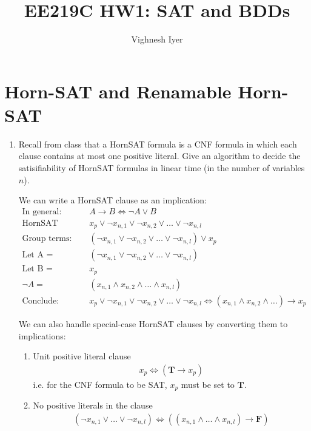 

\title{EE219C HW1: SAT and BDDs}
\author{Vighnesh Iyer}
\date{}
\maketitle

\section{Horn-SAT and Renamable Horn-SAT}
\begin{enumerate}[label=(\alph*)]
    \item {\color{blue}Recall from class that a HornSAT formula is a CNF formula in which each clause contains at most one positive literal. Give an algorithm to decide the satisifiability of HornSAT formulas in linear time (in the number of variables $n$).}

    We can write a HornSAT clause as an implication:
    \begin{align*}
        \text{In general: } &A \rightarrow B \iff \neg A \lor B \\
        \text{HornSAT Clause: } &x_p \lor \neg x_{n,1} \lor \neg x_{n,2} \lor \dots \lor \neg x_{n,l} \\
        \text{Group terms: } &(\neg x_{n,1} \lor \neg x_{n,2} \lor \dots \lor \neg x_{n,l}) \lor x_p \\
        \text{Let A = } &(\neg x_{n,1} \lor \neg x_{n,2} \lor \dots \lor \neg x_{n,l}) \\
        \text{Let B = } &x_p \\
        \neg A =& (x_{n,1} \land x_{n,2} \land \dots \land x_{n,l}) \\
        \text{Conclude: } &x_p \lor \neg x_{n,1} \lor \neg x_{n,2} \lor \dots \lor \neg x_{n,l} \iff (x_{n,1} \land x_{n,2} \land \dots) \rightarrow x_p
    \end{align*}

    We can also handle special-case HornSAT clauses by converting them to implications:
    \begin{enumerate}
        \item Unit positive literal clause
            \begin{align*}
                x_p \iff (\mathbf{T} \rightarrow x_p)
            \end{align*}
            i.e. for the CNF formula to be SAT, $x_p$ must be set to $\mathbf{T}$.
        \item No positive literals in the clause
            \begin{align*}
                (\neg x_{n,1} \lor \dots \lor \neg x_{n,l}) \iff ((x_{n,1} \land \dots \land x_{n,l}) \rightarrow \mathbf{F})
            \end{align*}
    \end{enumerate}


\end{enumerate}

